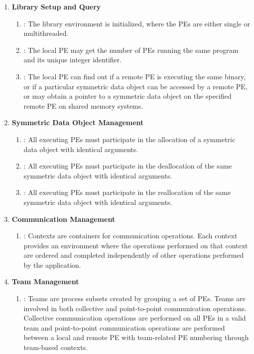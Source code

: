 \begin{enumerate}

\item \textbf{Library Setup and Query}
\begin{enumerate}
  \item {}: The \openshmem library environment is initialized,
   where the \acp{PE} are either single or multithreaded.
  \item {}: The local \ac{PE} may get the number of \acp{PE} running
      the same program and its unique integer identifier.
  \item {}: The local \ac{PE} can find out if a remote \ac{PE} is
      executing the same binary, or if a particular symmetric data object can be
      accessed by a remote \ac{PE}, or may obtain a pointer to a symmetric data
      object on the specified remote \ac{PE} on shared memory systems.
\end{enumerate}

\item \textbf{Symmetric Data Object Management}
\begin{enumerate}
  \item {}: All executing \acp{PE} must participate in the
      allocation of a symmetric data object with identical arguments.
  \item  {}: All executing \acp{PE} must participate in the
      deallocation of the same symmetric data object with identical arguments.
  \item  {}: All executing \acp{PE} must participate in the
      reallocation of the same symmetric data object with identical arguments.
\end{enumerate}

\item \textbf{Communication Management}
\begin{enumerate}
    \item {}: Contexts are containers for communication operations.
        Each context provides an environment where the operations performed on
        that context are ordered and completed independently of other operations
        performed by the application.
\end{enumerate}

\item \textbf{Team Management}
\begin{enumerate}
    \item {}: Teams are process subsets created by grouping a set of
    \acp{PE}. Teams are involved in both collective and point-to-point
    communication operations. Collective communication operations are performed
    on all \acp{PE} in a valid team and point-to-point communication operations
    are performed between a local and remote \ac{PE} with team-related \ac{PE}
    numbering through team-based contexts.
\end{enumerate}


\end{enumerate}
